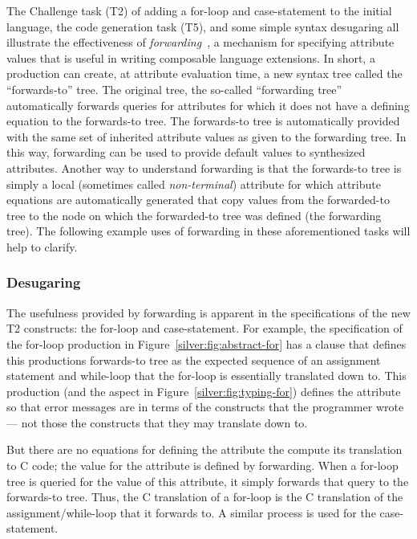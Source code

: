 The Challenge task (T2) of adding a for-loop and case-statement to the
initial language, the code generation task (T5), and some simple
syntax desugaring all illustrate the effectiveness of
\emph{forwarding}~\cite{vanwyk02}, a mechanism for specifying
attribute values that is useful in writing composable language
extensions.
%
In short, a production can create, at attribute evaluation time, a
new syntax tree called the ``forwards-to'' tree.   The original tree,
the so-called ``forwarding tree'' automatically forwards queries for
attributes for which it does not have a defining equation to the
forwards-to tree.
%
The forwards-to tree is automatically provided with the same set of
inherited attribute values as given to the forwarding tree.  In this
way, forwarding can be used to provide default values to synthesized
attributes.  Another way to understand forwarding is that the
forwards-to tree is simply a local (sometimes
called \emph{non-terminal}) attribute for which attribute equations
are automatically generated that copy values from the forwarded-to
tree to the node on which the forwarded-to tree was defined (the
forwarding tree).  The following example uses of forwarding in these
aforementioned tasks will help to clarify.

\subsubsection{Desugaring}

The usefulness provided by forwarding is apparent in the
specifications of the new T2 constructs: the for-loop and
case-statement.
%
For example, the specification of the for-loop production
 in Figure~\ref{silver:fig:abstract-for} has a
 clause that defines this productions forwards-to
tree as the expected sequence of an assignment statement and
while-loop that the for-loop is essentially translated down to.
%
This production (and the aspect in Figure~\ref{silver:fig:typing-for})
defines the  attribute
so that error messages
are in terms of the constructs that the programmer wrote --- not those
the constructs that they may translate down to.

But there are no equations for defining the  attribute the compute
its translation to C code; the value for the  attribute
is defined by forwarding.
%
When a for-loop tree is queried for the value of this attribute, it
simply forwards that query to the forwards-to tree.  Thus, the C
translation of a for-loop is the C translation of the
assignment/while-loop that it forwards to.
A similar process is used for the case-statement.

